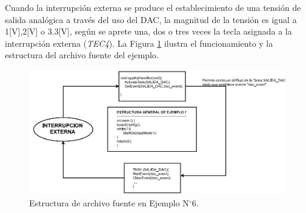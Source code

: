 \documentclass[12pt,letterpaper]{article}
\begin{document}
Cuando la interrupción externa se produce el establecimiento de una tensión de salida analógica a través del uso del DAC, la magnitud de la tensión es igual a 1[V],2[V] o 3.3[V], según se aprete una, dos o tres veces la tecla asignada a la interrupción externa (\textit{TEC4}). La Figura \ref{estructuraej6} ilustra el funcionamiento y la estructura del archivo fuente del ejemplo.
\begin{figure}[H]
\centering
\includegraphics[width=15 cm]{figuras/f37.png}
\caption{Estructura de archivo fuente en Ejemplo N$^{\circ}$6.}
\label{estructuraej6}
\end{figure}
\end{document}
